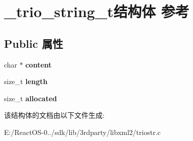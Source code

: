 \hypertarget{struct__trio__string__t}{}\section{\+\_\+trio\+\_\+string\+\_\+t结构体 参考}
\label{struct__trio__string__t}
\subsection*{Public 属性}
\begin{DoxyCompactItemize}
\item 
\mbox{\label{struct__trio__string__t_a6c215e8e4a3a6a080c4250393c11acc7}} 
char $\ast$ {\bfseries content}
\item 
\mbox{\label{struct__trio__string__t_a7b5146604672288af648b2ea97cdbd6e}} 
size\+\_\+t {\bfseries length}
\item 
\mbox{\label{struct__trio__string__t_a1fc635a01d1dacdd94483c55f5c52d04}} 
size\+\_\+t {\bfseries allocated}
\end{DoxyCompactItemize}


该结构体的文档由以下文件生成\+:\begin{DoxyCompactItemize}
\item 
E\+:/\+React\+O\+S-\/0../sdk/lib/3rdparty/libxml2/triostr.\+c\end{DoxyCompactItemize}
